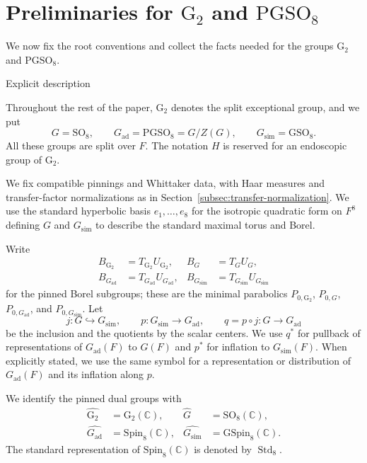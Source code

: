 \documentclass[12pt]{amsart}
\makeatletter
\renewcommand{\subsection}{\@startsection{subsection}{2}%
  \z@{.7\linespacing\@plus.5\linespacing}{.35\linespacing}%
  {\normalfont\bfseries\raggedright}}
\theoremstyle{definition}
\theoremstyle{plain}
\theoremstyle{remark}
\def\C{\mathbb{C}}%
\def\SO{\mathrm{SO}}
\def\GSO{\mathrm{GSO}}
\def\Spin{\mathrm{Spin}}
\def\PGSO{\mathrm{PGSO}}
\DeclareMathOperator{\Std}{Std}
\numberwithin{equation}{section}
\newcommand{\rG}{\mathrm{G}}
\newcommand{\GSpin}{\mathrm{GSpin}}
\makeatother
\begin{document}
\section{Preliminaries for $\rG_2$ and $\PGSO_8$}\label{sec:preliminaries-G2-PGSO8}

We now fix the root conventions and collect the facts needed for the groups $\rG_2$ and $\PGSO_8$.

\subsection{Explicit description}\label{subsec:pinned-groups}

Throughout the rest of the paper, $\rG_2$ denotes the split exceptional
group, and we put
\[
 G=\SO_8,\qquad G_{\mathrm{ad}}=\PGSO_8=G/Z(G),\qquad G_{\mathrm{sim}}=\GSO_8.
\]
All these groups are split over $F$. The notation $H$ is reserved for
an endoscopic group of $\rG_2$. 

We fix compatible pinnings and Whittaker data, with Haar measures and transfer-factor normalizations as in
Section~\ref{subsec:transfer-normalization}. 
We use the standard hyperbolic basis $e_1, \dots, e_8$ for the isotropic quadratic form on $F^8$ defining $G$ and $G_{\mathrm{sim}}$ to describe the standard maximal torus and Borel. 

Write
\[
 \begin{aligned}
 B_{\rG_2}&=T_{\rG_2}U_{\rG_2},& B_G&=T_GU_G,\\
 B_{G_{\mathrm{ad}}}&=T_{G_{\mathrm{ad}}}U_{G_{\mathrm{ad}}},& B_{G_{\mathrm{sim}}}&=T_{G_{\mathrm{sim}}}U_{G_{\mathrm{sim}}}
 \end{aligned}
\]
for the pinned Borel subgroups; these are the minimal parabolics
$P_{0,\rG_2}$, $P_{0,G}$, $P_{0,G_{\mathrm{ad}}}$, and $P_{0,G_{\mathrm{sim}}}$.
Let
\[
 j:G\hookrightarrow G_{\mathrm{sim}},\qquad
 p:G_{\mathrm{sim}} \longrightarrow G_{\mathrm{ad}},\qquad q=p\circ j:G\longrightarrow G_{\mathrm{ad}}
\]
be the inclusion and the quotients by the scalar centers. We use $q^*$
for pullback of representations of $G_{\mathrm{ad}}(F)$ to $G(F)$ and $p^*$
for inflation to $G_{\mathrm{sim}}(F)$. When explicitly stated, we use the same
symbol for a representation or distribution of $G_{\mathrm{ad}}(F)$ and its
inflation along $p$.

We identify the pinned dual groups with
\[
 \begin{aligned}
 \widehat{\rG_2}&=\rG_2(\C),& \widehat G&=\SO_8(\C),\\
 \widehat{G_{\mathrm{ad}}}&=\Spin_8(\C),& \widehat{G_{\mathrm{sim}}}&=\GSpin_8(\C).
 \end{aligned}
\]
The standard representation of $\Spin_8(\C)$ is denoted by $\Std_8$.
\end{document}
